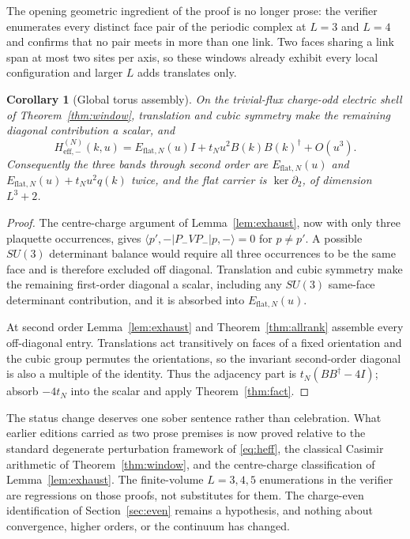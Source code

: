 \documentclass[11pt]{article}
\theoremstyle{plain}
\newtheorem{corollary}[theorem]{Corollary}
\theoremstyle{definition}
\theoremstyle{remark}
\newcommand{\dg}{^{\dagger}}
\begin{document}
The opening geometric ingredient of the proof is no longer prose: the
verifier enumerates every distinct face pair of the periodic complex at
$L=3$ and $L=4$ and confirms that no pair meets in more than one link. Two
faces sharing a link span at most two sites per axis, so these windows
already exhibit every local configuration and larger $L$ adds translates
only.

\begin{corollary}[Global torus assembly]\label{cor:assembly}
On the trivial-flux charge-odd electric shell of Theorem~\ref{thm:window},
translation and cubic symmetry make the remaining diagonal contribution a
scalar, and
\[
  H^{(N)}_{\mathrm{eff},-}(k,u)
  =E_{\mathrm{flat},N}(u)I+t_Nu^2B(k)B(k)\dg+O(u^3).
\]
Consequently the three bands through second order are
$E_{\mathrm{flat},N}(u)$ and
$E_{\mathrm{flat},N}(u)+t_Nu^2q(k)$ twice, and the flat carrier is
$\ker\partial_2$, of dimension $L^3+2$.
\end{corollary}

\begin{proof}
The centre-charge argument of Lemma~\ref{lem:exhaust}, now with only three
plaquette occurrences, gives
$\langle p',-|P_-VP_-|p,-\rangle=0$ for $p\neq p'$. A possible $SU(3)$
determinant balance would require all three occurrences to be the same face
and is therefore excluded off diagonal. Translation and cubic symmetry make
the remaining first-order diagonal a scalar, including any $SU(3)$ same-face
determinant contribution, and it is absorbed into $E_{\mathrm{flat},N}(u)$.

At second order Lemma~\ref{lem:exhaust} and Theorem~\ref{thm:allrank} assemble
every off-diagonal entry. Translations act transitively on faces of a fixed
orientation and the cubic group permutes the orientations, so the invariant
second-order diagonal is also a multiple of the identity. Thus the adjacency
part is $t_N(BB\dg-4I)$; absorb $-4t_N$ into the scalar and apply
Theorem~\ref{thm:fact}.
\end{proof}

The status change deserves one sober sentence rather than celebration. What
earlier editions carried as two prose premises is now proved relative to the
standard degenerate perturbation framework of \eqref{eq:heff}, the classical
Casimir arithmetic of Theorem~\ref{thm:window}, and the centre-charge
classification of Lemma~\ref{lem:exhaust}. The finite-volume $L=3,4,5$
enumerations in the verifier are regressions on those proofs, not substitutes
for them. The charge-even identification of Section~\ref{sec:even} remains a
hypothesis, and nothing about convergence, higher orders, or the continuum has
changed.
\end{document}
